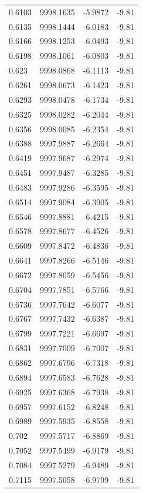 \begin{table}[H]
\begin{tabular}{llll}
0.6103 & 9998.1635 & -5.9872 & -9.81 \\
0.6135 & 9998.1444 & -6.0183 & -9.81 \\
0.6166 & 9998.1253 & -6.0493 & -9.81 \\
0.6198 & 9998.1061 & -6.0803 & -9.81 \\
0.623 & 9998.0868 & -6.1113 & -9.81 \\
0.6261 & 9998.0673 & -6.1423 & -9.81 \\
0.6293 & 9998.0478 & -6.1734 & -9.81 \\
0.6325 & 9998.0282 & -6.2044 & -9.81 \\
0.6356 & 9998.0085 & -6.2354 & -9.81 \\
0.6388 & 9997.9887 & -6.2664 & -9.81 \\
0.6419 & 9997.9687 & -6.2974 & -9.81 \\
0.6451 & 9997.9487 & -6.3285 & -9.81 \\
0.6483 & 9997.9286 & -6.3595 & -9.81 \\
0.6514 & 9997.9084 & -6.3905 & -9.81 \\
0.6546 & 9997.8881 & -6.4215 & -9.81 \\
0.6578 & 9997.8677 & -6.4526 & -9.81 \\
0.6609 & 9997.8472 & -6.4836 & -9.81 \\
0.6641 & 9997.8266 & -6.5146 & -9.81 \\
0.6672 & 9997.8059 & -6.5456 & -9.81 \\
0.6704 & 9997.7851 & -6.5766 & -9.81 \\
0.6736 & 9997.7642 & -6.6077 & -9.81 \\
0.6767 & 9997.7432 & -6.6387 & -9.81 \\
0.6799 & 9997.7221 & -6.6697 & -9.81 \\
0.6831 & 9997.7009 & -6.7007 & -9.81 \\
0.6862 & 9997.6796 & -6.7318 & -9.81 \\
0.6894 & 9997.6583 & -6.7628 & -9.81 \\
0.6925 & 9997.6368 & -6.7938 & -9.81 \\
0.6957 & 9997.6152 & -6.8248 & -9.81 \\
0.6989 & 9997.5935 & -6.8558 & -9.81 \\
0.702 & 9997.5717 & -6.8869 & -9.81 \\
0.7052 & 9997.5499 & -6.9179 & -9.81 \\
0.7084 & 9997.5279 & -6.9489 & -9.81 \\
0.7115 & 9997.5058 & -6.9799 & -9.81 \\

\end{tabular}
\end{table}
